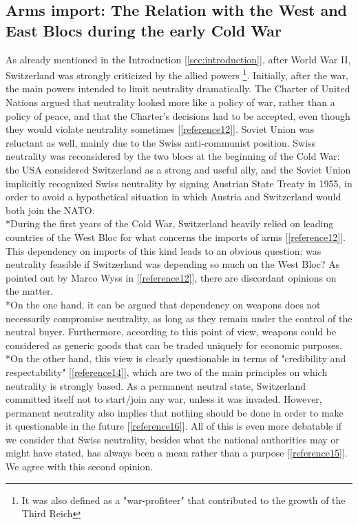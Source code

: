 \documentclass[a4paper]{article}
\begin{document}
\subsection{Arms import: The Relation with the West and East Blocs during the early Cold War}
\label{subsec:armsImport}
As already mentioned in the Introduction [\ref{sec:introduction}], after World War II, Switzerland was strongly criticized by the allied powers \footnote{It was also defined as a "war-profiteer" that contributed to the growth of the Third Reich}. Initially, after the war, the main powers intended to limit neutrality dramatically. The Charter of United Nations argued that neutrality looked more like a policy of war, rather than a policy of peace, and that the Charter's decisions had to be accepted, even though they would violate neutrality sometimes [\ref{reference12}]. Soviet Union was reluctant as well, mainly due to the Swiss anti-communist position.
Swiss neutrality was reconsidered by the two blocs at the beginning of the Cold War: the USA considered Switzerland as a strong and useful ally, and the Soviet Union implicitly recognized Swiss neutrality by signing Austrian State Treaty in 1955, in order to avoid a hypothetical situation in which Austria and Switzerland would both join the NATO. 
\\*During the first years of the Cold War, Switzerland heavily relied on leading countries of the West Bloc for what concerns the imports of arms [\ref{reference12}]. This dependency on imports of this kind leads to an obvious question: was neutrality feasible if Switzerland was depending so much on the West Bloc? As pointed out by Marco Wyss in [\ref{reference12}], there are discordant opinions on the matter. 
\\*On the one hand, it can be argued that dependency on weapons does not necessarily compromise neutrality, as long as they remain under the control of the neutral buyer. Furthermore, according to this point of view, weapons could be considered as generic goods that can be traded uniquely for economic purposes. 
\\*On the other hand, this view is clearly questionable in terms of "credibility and respectability" [\ref{reference14}], which are two of the main principles on which neutrality is strongly based. As a permanent neutral state, Switzerland committed itself not to start/join any war, unless it was invaded. However, permanent neutrality also implies that nothing should be done in order to make it questionable in the future [\ref{reference16}]. All of this is even more debatable if we consider that Swiss neutrality, besides what the national authorities may or might have stated, has always been a mean rather than a purpose [\ref{reference15}].
We agree with this second opinion.
\end{document}
